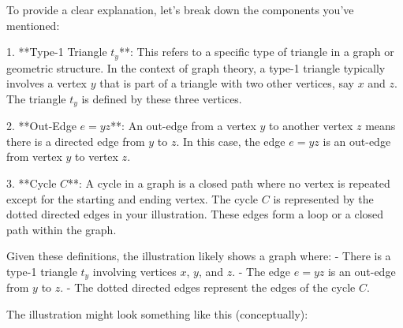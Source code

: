 To provide a clear explanation, let's break down the components you've mentioned:

1. **Type-1 Triangle \( t_y \)**: This refers to a specific type of triangle in a graph or geometric structure. In the context of graph theory, a type-1 triangle typically involves a vertex \( y \) that is part of a triangle with two other vertices, say \( x \) and \( z \). The triangle \( t_y \) is defined by these three vertices.

2. **Out-Edge \( e = yz \)**: An out-edge from a vertex \( y \) to another vertex \( z \) means there is a directed edge from \( y \) to \( z \). In this case, the edge \( e = yz \) is an out-edge from vertex \( y \) to vertex \( z \).

3. **Cycle \( C \)**: A cycle in a graph is a closed path where no vertex is repeated except for the starting and ending vertex. The cycle \( C \) is represented by the dotted directed edges in your illustration. These edges form a loop or a closed path within the graph.

Given these definitions, the illustration likely shows a graph where:
- There is a type-1 triangle \( t_y \) involving vertices \( x \), \( y \), and \( z \).
- The edge \( e = yz \) is an out-edge from \( y \) to \( z \).
- The dotted directed edges represent the edges of the cycle \( C \).

The illustration might look something like this (conceptually):

